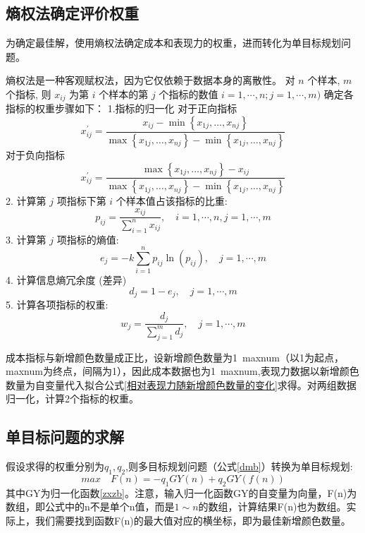 \documentclass{article}
\begin{document}
 \subsection{熵权法确定评价权重}
 为确定最佳解，使用熵权法确定成本和表现力的权重，进而转化为单目标规划问题。
 
 熵权法是一种客观赋权法，因为它仅依赖于数据本身的离散性。
 对 $n$ 个样本, $m$ 个指标, 则 $x_{i j}$ 为第 $i$ 个样本的第 $j$ 个指标的数值 $i=1, \cdots, n ; j=1, \cdots, m)$
 确定各指标的权重步骤如下：
 1.指标的归一化
 对于正向指标
 \begin{equation}
 x_{i j}^{\prime}=\frac{x_{i j}-\min \left\{x_{1 j}, \ldots, x_{n j}\right\}}{\max \left\{x_{1 j}, \ldots, x_{n j}\right\}-\min \left\{x_{1 j}, \ldots, x_{n j}\right\}}
 \label{zxzb}
 \end{equation}
 对于负向指标
 \begin{equation}
 x_{i j}^{\prime}=\frac{\max \left\{x_{1 j}, \ldots, x_{n j}\right\}-x_{i j}}{\max \left\{x_{1 j}, \ldots, x_{n j}\right\}-\min \left\{x_{1 j}, \ldots, x_{n j}\right\}}
 \end{equation}
 2. 计算第 $j$ 项指标下第 $i$ 个样本值占该指标的比重:
 $$p_{i j}=\frac{x_{i j}}{\sum_{i=1}^{n} x_{i j}}, \quad i=1, \cdots, n, j=1, \cdots, m$$
 3. 计算第 $j$ 项指标的熵值:
 $$e_{j}=-k \sum_{i=1}^{n} p_{i j} \ln \left(p_{i j}\right), \quad j=1, \cdots, m$$
 4. 计算信息熵冗余度 (差异)
 $$d_{j}=1-e_{j}, \quad j=1, \cdots, m$$
 5. 计算各项指标的权重:
 $$w_{j}=\frac{d_{j}}{\sum_{j=1}^{m} d_{j}}, \quad j=1, \cdots, m$$
 
 成本指标与新增颜色数量成正比，设新增颜色数量为1~maxnum（以1为起点，maxnum为终点，间隔为1），因此成本数据也为1~maxnum,表现力数据以新增颜色数量为自变量代入拟合公式\ref{相对表现力随新增颜色数量的变化}求得。对两组数据归一化，计算2个指标的权重。
 \subsection{单目标问题的求解}
 假设求得的权重分别为$q_1,q_2$,则多目标规划问题（公式\eqref{dmb}）转换为单目标规划:
  \begin{equation}
 max \quad F(n) = -q_1  GY(n) +q_2 GY(f(n))
 \label{dan}
 \end{equation}
 其中GY为归一化函数\eqref{zxzb}。注意，输入归一化函数GY的自变量为向量，F(n)为数组，即公式中的n不是单个n值，而是$1 \sim n$的数组，计算结果F(n)也为数组。实际上，我们需要找到函数F(n)的最大值对应的横坐标，即为最佳新增颜色数量。
\end{document}

